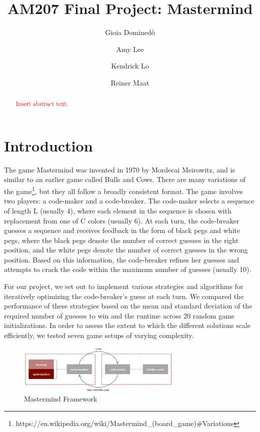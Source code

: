 \documentclass[11pt]{article}
\title{AM207 Final Project: Mastermind}
\author{Gioia Domined\`o \and Amy Lee \and Kendrick Lo \and Reiner Maat}
\begin{document}
\maketitle{}

\begin{abstract}
\textcolor{red}{Insert abstract text.}
\end{abstract}

\pagestyle{plain}

\section{Introduction}

The game Mastermind was invented in 1970 by Mordecai Meirowitz, and is similar to an earlier game called Bulls and Cows. There are many variations of the game\footnote{https://en.wikipedia.org/wiki/Mastermind\_(board\_game)\#Variations}, but they all follow a broadly consistent format. The game involves two players: a code-maker and a code-breaker. The code-maker selects a sequence of length L (usually 4), where each element in the sequence is chosen with replacement from one of C colors (usually 6). At each turn, the code-breaker guesses a sequence and receives feedback in the form of black pegs and white pegs, where the black pegs denote the number of correct guesses in the right position, and the white pegs denote the number of correct guesses in the wrong position. Based on this information, the code-breaker refines her guesses and attempts to crack the code within the maximum number of guesses (usually 10).

For our project, we set out to implement various strategies and algorithms for iteratively optimizing the code-breaker's guess at each turn. We compared the performance of these strategies based on the mean and standard deviation of the required number of guesses to win and the runtime across 20 random game initializations. In order to assess the extent to which the different solutions scale efficiently, we tested seven game setups of varying complexity.

\begin{figure}[!htbp]
\centering
\includegraphics[width=0.7\textwidth]{img/game_setup}
\caption{Mastermind Framework}
\label{fig:game_setup}
\end{figure}
\end{document}

